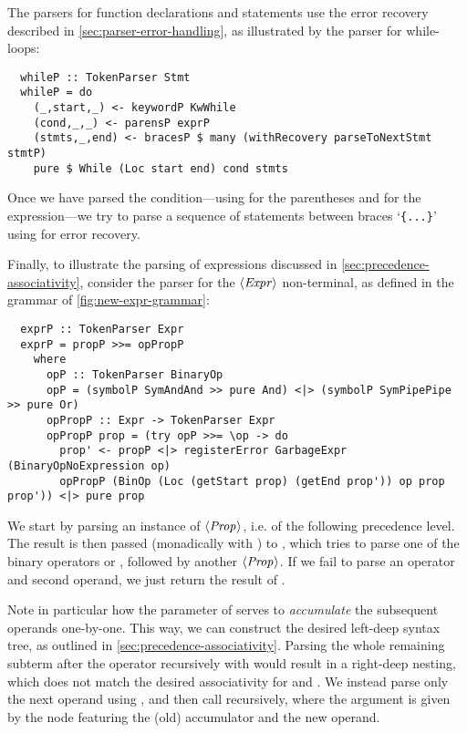 The parsers for function declarations and statements use the error recovery
described in \cref{sec:parser-error-handling}, as illustrated by the parser for
while-loops:
\begin{verbatim}
  whileP :: TokenParser Stmt
  whileP = do
    (_,start,_) <- keywordP KwWhile
    (cond,_,_) <- parensP exprP
    (stmts,_,end) <- bracesP $ many (withRecovery parseToNextStmt stmtP)
    pure $ While (Loc start end) cond stmts
\end{verbatim}
%
Once we have parsed the condition---using  for the parentheses and
 for the expression---we try to parse a sequence of statements
between braces `\verb|{...}|' using  for
error recovery.

Finally, to illustrate the parsing of expressions discussed in
\cref{sec:precedence-associativity}, consider the parser for the $\langle \textit{Expr}\kern.7pt \rangle$
non-terminal, as defined in the grammar of \cref{fig:new-expr-grammar}:
%
\begin{verbatim}
  exprP :: TokenParser Expr
  exprP = propP >>= opPropP
    where
      opP :: TokenParser BinaryOp
      opP = (symbolP SymAndAnd >> pure And) <|> (symbolP SymPipePipe >> pure Or)
      opPropP :: Expr -> TokenParser Expr
      opPropP prop = (try opP >>= \op -> do
        prop' <- propP <|> registerError GarbageExpr (BinaryOpNoExpression op)
        opPropP (BinOp (Loc (getStart prop) (getEnd prop')) op prop prop')) <|> pure prop
\end{verbatim}
%
We start by parsing an instance of $\langle \textit{Prop}\kern.7pt \rangle$, i.e. of the following precedence
level. The result is then passed (monadically with \haskell{>>=}) to
, which tries to parse one of the binary operators \spl{&&} or
\code{||}, followed by another $\langle \textit{Prop}\kern.7pt \rangle$.
If we fail to parse an operator and second operand, we just return the
result of .

Note in particular how the parameter of  serves to
\emph{accumulate} the subsequent operands one-by-one. This way, we can
construct the desired left-deep syntax tree, as outlined in
\cref{sec:precedence-associativity}.
Parsing the whole remaining subterm after the operator recursively with
 would result in a right-deep nesting, which does not match the
desired associativity for \spl{&&} and \code{||}.
We instead parse only the next operand using , and then call
 recursively, where the argument is given by the 
node featuring the (old) accumulator and the new operand.

